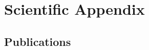 \documentclass[print]{styles/friggeri-cv-mac} %
\begin{document}
\newpage
\section{Scientific Appendix}\vspace{-5pt}

\subsection{Publications}
\vspace{-1cm}
\nocite{*}
\printbibliography[title={\emptyset}]
\end{document}
